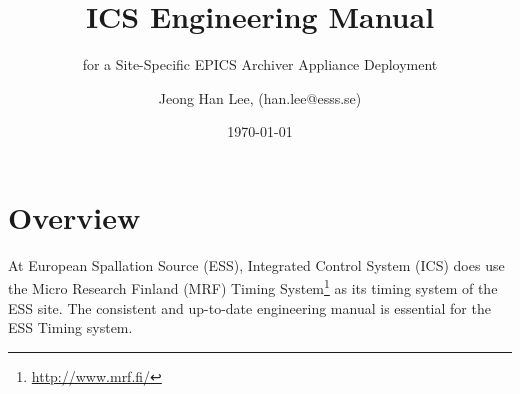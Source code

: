\documentclass[11pt
  , a4paper
  , article
  , oneside
  , showtrims
]{memoir}
\begin{document}


\date{\today}




\title{ICS Engineering Manual}
\subtitle{for a Site-Specific EPICS Archiver Appliance Deployment}
\author{Jeong Han Lee, (han.lee@esss.se)}



\showtrimson

\esstitle
\newpage
\tableofcontents
\newpage



\chapter{Overview}
At European Spallation Source (ESS), Integrated Control System (ICS) does use the Micro Research Finland (MRF) Timing System{\footnote{\url{http://www.mrf.fi/}}} as its timing system of the ESS site. The consistent and up-to-date engineering manual is essential for the ESS Timing system.
\end{document}
